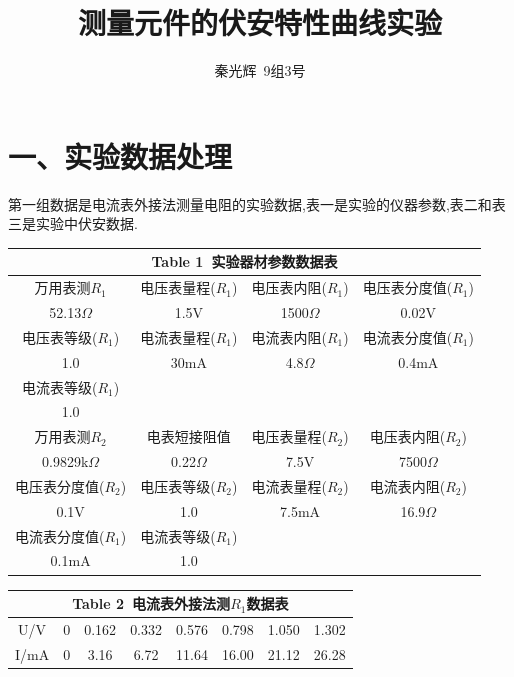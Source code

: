 \documentclass[a4paper,10pt,notitlepage]{report}
\begin{document}
\title{测量元件的伏安特性曲线实验}
\author{秦光辉\ 9组3号}
\maketitle

\section*{一、实验数据处理}

	第一组数据是电流表外接法测量电阻的实验数据,表一是实验的仪器参数,表二和表三是实验中伏安数据. \\
	
\begin{table}[htbp]
\centering
	\begin{tabular}{|c|c|c|c|}
	
		\multicolumn{4}{c}{Table 1\ 实验器材参数数据表} \\
		\hline
		万用表测$R_1$ & 电压表量程($R_1$) & 电压表内阻($R_1$) & 电压表分度值($R_1$) \\
		\hline
		52.13$\Omega$ & 1.5V & 1500$\Omega$ & 0.02V \\
		\hline
		电压表等级($R_1$) & 电流表量程($R_1$) & 电流表内阻($R_1$) & 电流表分度值($R_1$) \\
		\hline
		1.0 & 30mA & 4.8$\Omega$ & 0.4mA \\
		\hline
		电流表等级($R_1$) &&& \\
		\hline
		1.0 &&& \\
		\hline
		万用表测$R_2$ & 电表短接阻值 & 电压表量程($R_2$) & 电压表内阻($R_2$) \\
		\hline
		0.9829k$\Omega$ & 0.22$\Omega$ & 7.5V & 7500$\Omega$ \\
		\hline
		电压表分度值($R_2$) & 电压表等级($R_2$) & 电流表量程($R_2$) & 电流表内阻($R_2$) \\
		\hline
		0.1V & 1.0 & 7.5mA & 16.9$\Omega$ \\
		\hline
		电流表分度值($R_1$) & 电流表等级($R_1$) &&\\
		\hline
		0.1mA & 1.0 && \\
		\hline

	\end{tabular}
\end{table}

\begin{table}[bhtp]
\centering
	\begin{tabular}{|c|c|c|c|c|c|c|c|}
	
	\multicolumn{8}{c}{Table 2\ 电流表外接法测$R_1$数据表} \\
	\hline
	U/V & 0 & 0.162 & 0.332 & 0.576 & 0.798 & 1.050 & 1.302 \\
	\hline
	I/mA & 0 & 3.16 & 6.72 & 11.64 & 16.00 & 21.12 & 26.28 \\
	\hline
	
	\end{tabular}
\end{table}
\end{document}

